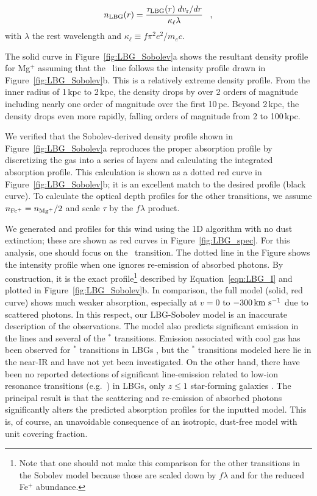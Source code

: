 \documentclass[12pt,preprint]{aastex}
\begin{document}
\begin{equation}
n_{\rm LBG}(r) = \frac{\tau_{\rm LBG}(r) \; dv_{\rm r}/dr}{\kappa_\ell
  \lambda} \;\;\; ,
\label{eqn:Sobolev}
\end{equation}
with $\lambda$ the rest wavelength and $\kappa_\ell \equiv f\pi^2
e^2/m_e c$.  

The solid curve in Figure~\ref{fig:LBG_Sobolev}a shows the
resultant density profile for Mg$^+$ assuming that the \mgiia\ line
follows the intensity profile drawn in Figure~\ref{fig:LBG_Sobolev}b. 
This is a relatively extreme density profile.  From the inner radius
of 1\,kpc to 2\,kpc, the density drops by over 2 orders of
magnitude including nearly one order of magnitude over the first
10\,pc.  Beyond 2\,kpc, the density drops even more rapidly, falling
orders of magnitude from 2 to 100\,kpc.

We verified that the Sobolev-derived density profile shown in
Figure~\ref{fig:LBG_Sobolev}a
reproduces the proper
absorption profile by discretizing the gas into a series of layers
and calculating the integrated absorption profile.  This
calculation is shown as a dotted red curve in
Figure~\ref{fig:LBG_Sobolev}b; it is an excellent
match to the desired profile (black curve).
To calculate the optical depth profiles for the other transitions, we
assume $n_{\rm Fe^+} = n_{\rm Mg^+}/2$ and scale $\tau$ by the $f\lambda$ product.

We generated  and  profiles for this wind
using the 1D algorithm with no dust extinction; these are shown as
red curves in Figure~\ref{fig:LBG_spec}.   For this analysis, one
should focus on the \mgiia\ transition.  The dotted line in the Figure
shows the intensity profile when one ignores re-emission
of absorbed photons.  By construction, it is the exact profile\footnote{Note that
  one should not make this comparison for the other transitions in
  the Sobolev model because those are scaled down by $f\lambda$ and
  for  the reduced Fe$^+$ abundance.} 
described by Equation~\ref{eqn:LBG_I} and plotted in
Figure~\ref{fig:LBG_Sobolev}b.   In comparison, the full model (solid,
red curve)
shows much weaker absorption, especially at $v = 0$ to $-300 \, {\rm km~s^{-1}}$
due to scattered photons.
In this respect, our LBG-Sobolev model is an
inaccurate description of the observations. The model
also predicts significant emission in the  lines and several of
the $^*$ transitions.   Emission associated with cool gas
has been observed for $^*$
transitions in LBGs \citep{prs+02,shapley03}, but
the $^*$ transitions
modeled here lie in the near-IR and have not yet been investigated.
On the other hand, there have been no 
reported detections of significant line-emission related to low-ion resonance
transitions (e.g.\ ) in LBGs, only $z \le 1$ star-forming galaxies
\citep{wcp+09,rubin09}.  
The principal result is that the scattering and re-emission of
absorbed photons significantly alters the predicted absorption profiles
for the inputted model.  This is, of course, an unavoidable
consequence of an isotropic, dust-free model with unit covering
fraction.
\end{document}
